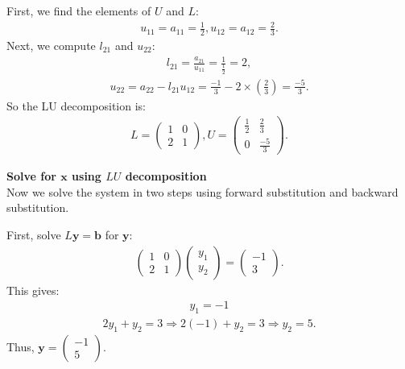 \documentclass[journal]{IEEEtran}
\begin{document}
First, we find the elements of $U$ and $L$:  
\begin{align}  
u_{11} = a_{11} = \frac{1}{2}, u_{12} = a_{12} = \frac{2}{3}.  
\end{align}  
Next, we compute $l_{21}$ and $u_{22}$:  
\begin{align}  
l_{21} = \frac{a_{21}}{u_{11}} = \frac{1}{\frac{1}{2}} = 2,  
\end{align}  
\begin{align}  
u_{22} = a_{22} - l_{21} u_{12} = \frac{-1}{3} - 2 \times (\frac{2}{3}) = \frac{-5}{3}.  
\end{align}  
So the LU decomposition is:  
\begin{align}  
L = \begin{pmatrix} 1 & 0 \\ 2 & 1 \end{pmatrix}, U = \begin{pmatrix} \frac{1}{2} & \frac{2}{3} \\ 0 & \frac{-5}{3} \end{pmatrix}.  
\end{align}

\textbf{Solve for $\mathbf{x}$ using $LU$ decomposition}  \\
Now we solve the system in two steps using forward substitution and backward substitution.  

First, solve $L \mathbf{y} = \mathbf{b}$ for $\mathbf{y}$:  
\begin{align}  
\begin{pmatrix} 1 & 0 \\ 2 & 1 \end{pmatrix} \begin{pmatrix} y_1 \\ y_2 \end{pmatrix} = \begin{pmatrix} -1 \\ 3 \end{pmatrix}.  
\end{align}  
This gives:  
\begin{align}  
y_1 = -1
\end{align}
\begin{align}
2y_1 + y_2 = 3 \Rightarrow 2(-1) + y_2 = 3 \Rightarrow y_2 = 5.  
\end{align}  
Thus, $\mathbf{y} = \begin{pmatrix} -1 \\ 5 \end{pmatrix}$.  
\end{document}
